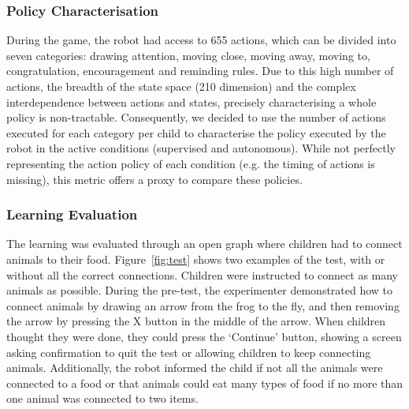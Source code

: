 \subsubsection{Policy Characterisation}

During the game, the robot had access to 655 actions, which can be divided into seven categories: drawing attention, moving close, moving away, moving to, congratulation, encouragement and reminding rules. Due to this high number of actions, the breadth of the state space (210 dimension) and the complex interdependence between actions and states, precisely characterising a whole policy is non-tractable. Consequently, we decided to use the number of actions executed for each category per child to characterise the policy executed by the robot in the active conditions (supervised and autonomous). While not perfectly representing the action policy of each condition (e.g. the timing of actions is missing), this metric offers a proxy to compare these policies. 

\subsubsection{Learning Evaluation} \label{sec:tuto_test}
The learning was evaluated through an open graph where children had to connect animals to their food. Figure~\ref{fig:test} shows two examples of the test, with or without all the correct connections. Children were instructed to connect as many animals as possible. During the pre-test, the experimenter demonstrated how to connect animals by drawing an arrow from the frog to the fly, and then removing the arrow by pressing the X button in the middle of the arrow. When children thought they were done, they could press the `Continue' button, showing a screen asking confirmation to quit the test or allowing children to keep connecting animals. Additionally, the robot informed the child if not all the animals were connected to a food or that animals could eat many types of food if no more than one animal was connected to two items. 

